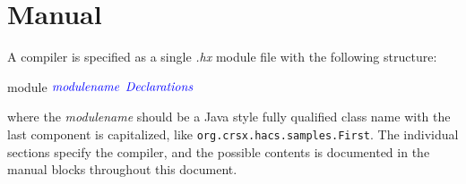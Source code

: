 \documentclass[11pt]{article} %
\begin{document}
\appendix\small

\section{Manual}\label{app:manual}

\begin{manual}\label{man:structure}
  A \HAX compiler is specified as a single \emph{.hx} module file with the following structure:
\begin{hacs}[mathescape,xleftmargin=\parindent]
module $\text{\it\color{blue}modulename}$
{
  $\text{\it\color{blue}Declarations}$
}
\end{hacs}
  where the \emph{modulename} should be a Java style fully qualified class name with the last
  component is capitalized, like \verb|org.crsx.hacs.samples.First|. The individual sections specify
  the compiler, and the possible contents is documented in the manual blocks throughout this
  document.
\end{manual}
\end{document}

